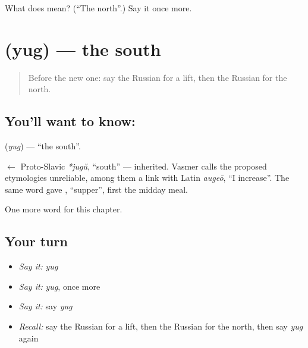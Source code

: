 \begin{tcolorbox}[breakable,colback=teal!4,colframe=teal!35!black,title={Before you move on}]
What does  mean? (\textquotedblleft{}The north\textquotedblright{}.) Say it once more.
\end{tcolorbox}
\section[\texorpdfstring{\ru{юг} (yug)}{юг (yug)}]{ (yug) — the south}

\label{lesson:RU-C90-south}



\begin{quote}
Before the new one: say the Russian for a lift, then the Russian for the north.
\end{quote}

\subsection*{You'll want to know: }
\textbf{} (\emph{yug}) — \textquotedblleft{}the south\textquotedblright{}.

\begin{cousinweb}
\textbf{} $\leftarrow$ Proto-Slavic \emph{*jugŭ}, \textquotedblleft{}south\textquotedblright{} — inherited. Vasmer calls the proposed etymologies unreliable, among them a link with Latin \emph{augeō}, \textquotedblleft{}I increase\textquotedblright{}. The same word gave \emph{}, \textquotedblleft{}supper\textquotedblright{}, first the midday meal.
\end{cousinweb}

\begin{grammarlens}[title={What you've built}]
One more word for this chapter.
\end{grammarlens}

\subsection*{Your turn}
\begin{itemize}
\raggedright
  \item \emph{Say it:} \emph{yug}
  \item \emph{Say it:} \emph{yug}, once more
  \item \emph{Say it:} say \emph{yug}
  \item \emph{Recall:} say the Russian for a lift, then the Russian for the north, then say \emph{yug} again
\end{itemize}

